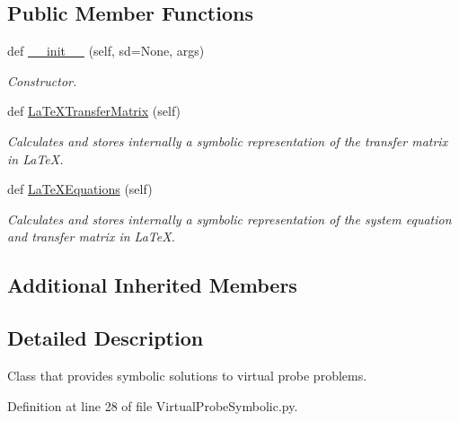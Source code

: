 \subsection*{Public Member Functions}
\begin{DoxyCompactItemize}
\item 
def \hyperlink{classSignalIntegrity_1_1SystemDescriptions_1_1VirtualProbeSymbolic_1_1VirtualProbeSymbolic_a72fa31992e716f60779f561f6cdbb4ce}{\+\_\+\+\_\+init\+\_\+\+\_\+} (self, sd=None, args)
\begin{DoxyCompactList}\small\item\em Constructor. \end{DoxyCompactList}\item 
def \hyperlink{classSignalIntegrity_1_1SystemDescriptions_1_1VirtualProbeSymbolic_1_1VirtualProbeSymbolic_adc83c150e43916083e3379cd4b9bb80e}{La\+Te\+X\+Transfer\+Matrix} (self)
\begin{DoxyCompactList}\small\item\em Calculates and stores internally a symbolic representation of the transfer matrix in La\+TeX. \end{DoxyCompactList}\item 
def \hyperlink{classSignalIntegrity_1_1SystemDescriptions_1_1VirtualProbeSymbolic_1_1VirtualProbeSymbolic_a3f6cd3290ceb07e8985e1eb832be3934}{La\+Te\+X\+Equations} (self)
\begin{DoxyCompactList}\small\item\em Calculates and stores internally a symbolic representation of the system equation and transfer matrix in La\+TeX. \end{DoxyCompactList}\end{DoxyCompactItemize}
\subsection*{Additional Inherited Members}


\subsection{Detailed Description}
Class that provides symbolic solutions to virtual probe problems. 



Definition at line 28 of file Virtual\+Probe\+Symbolic.\+py.



